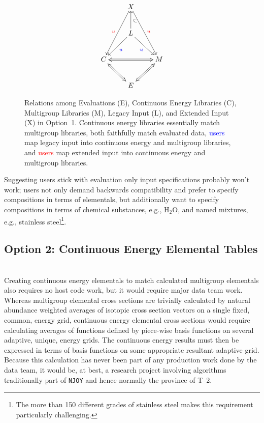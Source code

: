 \documentclass[12pt]{lamemo}
\begin{document}
\begin{figure}\centering
\[
\xymatrix{ & X \ar[ddl]_{\textcolor{red}{u}}
  \ar[ddr]^{\textcolor{red}{u}} & \\
  & L \ar[dl]^{\textcolor{blue}{u}} \ar[dr]_{\textcolor{blue}{u}}
  \ar[u]_{\subset} & \\
  C \ar@{<=>}[rr] & & M \\ & E \ar@{<=>}[ul] \ar@{<=>}[ur]& }
\]
\caption{Relations among Evaluations (E), Continuous Energy Libraries
  (C), Multigroup Libraries (M), Legacy Input (L), and Extended Input
  (X) in Option~1.  Continuous energy libraries essentially match
  multigroup libraries, both faithfully match evaluated data,
  \textcolor{blue}{users} map legacy input into continuous energy and
  multigroup libraries, and \textcolor{red}{users} map extended input
  into continuous energy and multigroup libraries.} \label{fig:1}
\end{figure}

Suggesting users stick with evaluation only input specifications
probably won't work; users not only demand backwards compatibility and
prefer to specify compositions in terms of elementals, but
additionally want to specify compositions in terms of chemical
substances, e.g., $\mathrm{H}_2\mathrm{O}$, and named mixtures, e.g.,
stainless steel\footnote{The more than 150 different grades of
  stainless steel makes this requirement particularly challenging.}.

\subsection{Option 2: Continuous Energy Elemental Tables}\mbox{}\\

Creating continuous energy elementals to match calculated multigroup
elementals also requires no host code work, but it would require major
data team work.  Whereas multigroup elemental cross sections are
trivially calculated by natural abundance weighted averages of
isotopic cross section vectors on a single fixed, common, energy
grid\cite[Kinematic Quantities]{gray09}, continuous energy elemental
cross sections would require calculating averages of functions defined
by piece-wise basis functions on several adaptive, unique, energy
grids.  The continuous energy results must then be expressed in terms
of basis functions on some appropriate resultant adaptive grid.
Because this calculation has never been part of any production work
done by the data team, it would be, at best, a research project
involving algorithms traditionally part of \texttt{NJOY} and hence
normally the province of T--2.
\end{document}
